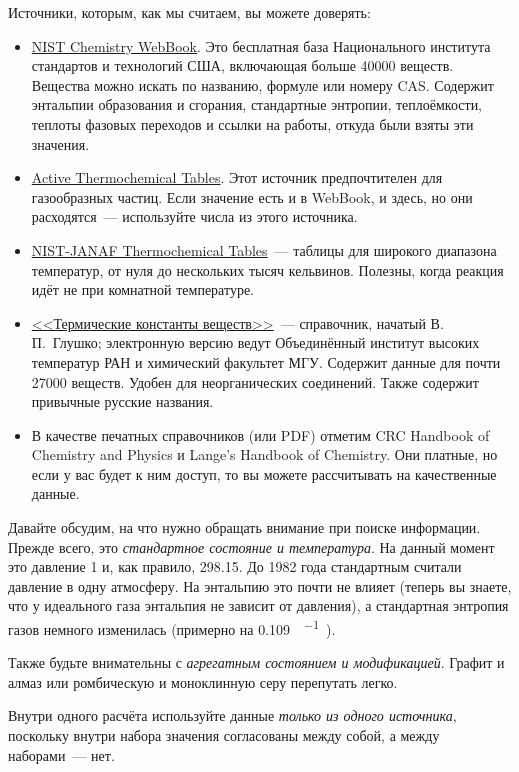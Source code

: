 Источники, которым, как мы считаем, вы можете доверять:

\begin{itemize}
    \item \href{https://webbook.nist.gov/chemistry/}{NIST Chemistry WebBook}. Это бесплатная база Национального института стандартов и технологий США, включающая больше \num{40000} веществ. Вещества можно искать по названию, формуле или номеру CAS. Содержит энтальпии образования и сгорания, стандартные энтропии, теплоёмкости, теплоты фазовых переходов и ссылки на работы, откуда были взяты эти значения.
    \item \href{https://atct.anl.gov}{Active Thermochemical Tables}. Этот источник предпочтителен для газообразных частиц. Если значение есть и в WebBook, и здесь, но они расходятся~--- используйте числа из этого источника.
    \item \href{https://janaf.nist.gov}{NIST-JANAF Thermochemical Tables}~--- таблицы для широкого диапазона температур, от нуля до нескольких тысяч кельвинов. Полезны, когда реакция идёт не при комнатной температуре.
    \item \href{https://www.chem.msu.ru/cgi-bin/tkv.pl}{<<Термические константы веществ>>}~--- справочник, начатый В.\,П.~Глушко; электронную версию ведут Объединённый институт высоких температур РАН и химический факультет МГУ. Содержит данные для почти \num{27000} веществ. Удобен для неорганических соединений. Также содержит привычные русские названия.
    \item В качестве печатных справочников (или PDF) отметим CRC Handbook of Chemistry and Physics и Lange's Handbook of Chemistry. Они платные, но если у вас будет к ним доступ, то вы можете рассчитывать на качественные данные.
\end{itemize}

Давайте обсудим, на что нужно обращать внимание при поиске информации. Прежде всего, это \emph{стандартное состояние и температура}. На данный момент это давление \qty{1}{\ruBar} и, как правило, \qty{298,15}{\ruK}. До 1982 года стандартным считали давление в одну атмосферу. На энтальпию это почти не влияет (теперь вы знаете, что у идеального газа энтальпия не зависит от давления), а стандартная энтропия газов немного изменилась (примерно на \qty{0,109}{\ruJ\per\ruK\ruMole}).

Также будьте внимательны с \emph{агрегатным состоянием и модификацией}. Графит и алмаз или ромбическую и моноклинную серу перепутать легко.

Внутри одного расчёта используйте данные \emph{только из одного источника}, поскольку внутри набора значения согласованы между собой, а между наборами~--- нет.

